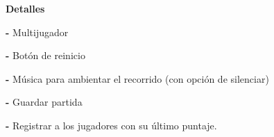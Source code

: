 \documentclass{article}
\begin{document}
     \vspace{0.3cm}
     
      \textbf{Detalles}
      
      \vspace{0.3cm}
      
      \textbf{-} Multijugador
      
      \vspace{0.3cm}
      
      \textbf{-} Botón de reinicio
      
      \vspace{0.3cm}
      
      \textbf{-} Música para ambientar el recorrido (con opción de silenciar)
      
      \vspace{0.3cm}
      
      \textbf{-} Guardar partida
      
      \vspace{0.3cm}
      
      \textbf{-} Registrar a los jugadores con su último puntaje.
     
      \vspace{1.5cm}
      
\end{document}
